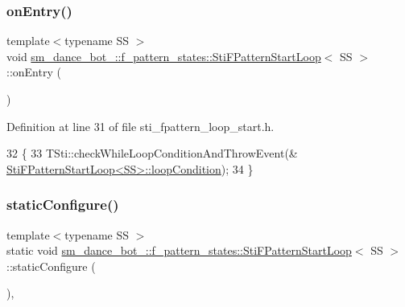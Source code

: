 \subsubsection{\texorpdfstring{on\+Entry()}{onEntry()}}
{\footnotesize\ttfamily template$<$typename SS $>$ \\
void \hyperlink{classsm__dance__bot__2_1_1f__pattern__states_1_1StiFPatternStartLoop}{sm\+\_\+dance\+\_\+bot\+\_\+::f\+\_\+pattern\+\_\+states\+::\+Sti\+F\+Pattern\+Start\+Loop}$<$ SS $>$\+::on\+Entry (\begin{DoxyParamCaption}{ }\end{DoxyParamCaption})\hspace{0.3cm}{\ttfamily [inline]}}



Definition at line 31 of file sti\+\_\+fpattern\+\_\+loop\+\_\+start.\+h.


\begin{DoxyCode}
32   \{
33     TSti::checkWhileLoopConditionAndThrowEvent(&
      \hyperlink{classsm__dance__bot__2_1_1f__pattern__states_1_1StiFPatternStartLoop_a196f787a1686a408e9e36b8c99cf4db9}{StiFPatternStartLoop<SS>::loopCondition});
34   \}
\end{DoxyCode}
\mbox{\label{classsm__dance__bot__2_1_1f__pattern__states_1_1StiFPatternStartLoop_ab6331bda3a9b7c5e33bc903ea93a91ba}} 
\subsubsection{\texorpdfstring{static\+Configure()}{staticConfigure()}}
{\footnotesize\ttfamily template$<$typename SS $>$ \\
static void \hyperlink{classsm__dance__bot__2_1_1f__pattern__states_1_1StiFPatternStartLoop}{sm\+\_\+dance\+\_\+bot\+\_\+::f\+\_\+pattern\+\_\+states\+::\+Sti\+F\+Pattern\+Start\+Loop}$<$ SS $>$\+::static\+Configure (\begin{DoxyParamCaption}{ }\end{DoxyParamCaption})\hspace{0.3cm}{\ttfamily [inline]}, {\ttfamily [static]}}



